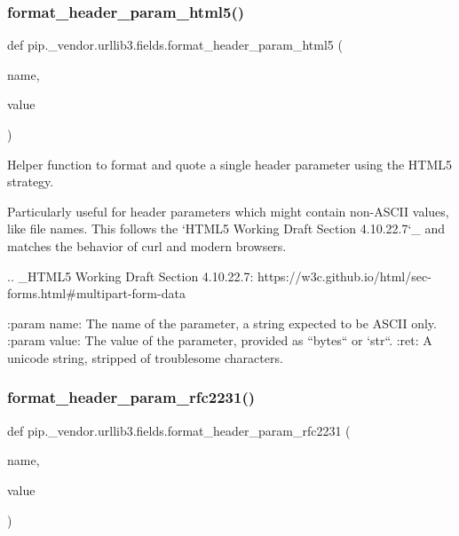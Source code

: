 \subsubsection{\texorpdfstring{format\+\_\+header\+\_\+param\+\_\+html5()}{format\_header\_param\_html5()}}
{\footnotesize\ttfamily def pip.\+\_\+vendor.\+urllib3.\+fields.\+format\+\_\+header\+\_\+param\+\_\+html5 (\begin{DoxyParamCaption}\item[{}]{name,  }\item[{}]{value }\end{DoxyParamCaption})}

\begin{DoxyVerb}Helper function to format and quote a single header parameter using the
HTML5 strategy.

Particularly useful for header parameters which might contain
non-ASCII values, like file names. This follows the `HTML5 Working Draft
Section 4.10.22.7`_ and matches the behavior of curl and modern browsers.

.. _HTML5 Working Draft Section 4.10.22.7:
    https://w3c.github.io/html/sec-forms.html#multipart-form-data

:param name:
    The name of the parameter, a string expected to be ASCII only.
:param value:
    The value of the parameter, provided as ``bytes`` or `str``.
:ret:
    A unicode string, stripped of troublesome characters.
\end{DoxyVerb}
 \mbox{\label{namespacepip_1_1__vendor_1_1urllib3_1_1fields_a2c332345c140f63acb8b1ce81f0ead61}} 
\subsubsection{\texorpdfstring{format\+\_\+header\+\_\+param\+\_\+rfc2231()}{format\_header\_param\_rfc2231()}}
{\footnotesize\ttfamily def pip.\+\_\+vendor.\+urllib3.\+fields.\+format\+\_\+header\+\_\+param\+\_\+rfc2231 (\begin{DoxyParamCaption}\item[{}]{name,  }\item[{}]{value }\end{DoxyParamCaption})}

